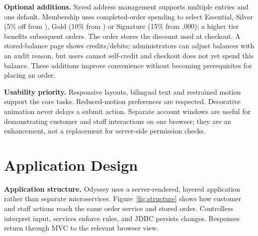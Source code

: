 \documentclass[11pt,a4paper]{article}
\newcommand{\EUR}{\texteuro}
\begin{document}
\textbf{Optional additions.} Saved address management supports multiple entries and one default. Membership uses completed-order spending to select Essential, Silver (5\% off from \EUR200), Gold (10\% from \EUR500) or Signature (15\% from \EUR1,000); a higher tier benefits subsequent orders. The order stores the discount used at checkout. A stored-balance page shows credits/debits; administrators can adjust balances with an audit reason, but users cannot self-credit and checkout does not yet spend this balance. These additions improve convenience without becoming prerequisites for placing an order.

\textbf{Usability priority.} Responsive layouts, bilingual text and restrained motion support the core tasks. Reduced-motion preferences are respected. Decorative animation never delays a submit action. Separate account windows are useful for demonstrating customer and staff interactions on one browser; they are an enhancement, not a replacement for server-side permission checks.

\newpage
\section{Application Design}
\textbf{Application structure.} Odyssey uses a server-rendered, layered application rather than separate microservices. Figure~\ref{fig:structure} shows how customer and staff actions reach the same order service and stored order. Controllers interpret input, services enforce rules, and JDBC persists changes. Responses return through MVC to the relevant browser view.
\end{document}
